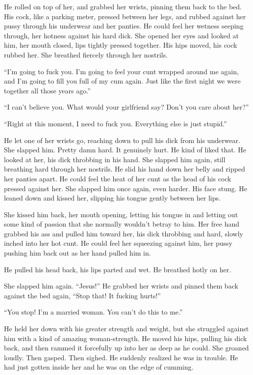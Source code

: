 \documentclass[letterpaper]{article}
\begin{document}
He rolled on top of her, and grabbed her wrists, pinning them back to the bed. His cock, like a parking meter, pressed between her legs, and rubbed against her pussy through his underwear and her panties.
He could feel her wetness seeping through, her hotness against his hard dick.
She opened her eyes and looked at him, her mouth closed, lips tightly pressed together.
His hips moved, his cock rubbed her. She breathed fiercely through her nostrils.

``I'm going to fuck you. I'm going to feel your cunt wrapped around me again, and I'm going to fill you full of my cum again. Just like the first night we were together all those years ago.''

``I can't believe you. What would your girlfriend say? Don't you care about her?''

``Right at this moment, I need to fuck you. Everything else is just stupid.''

He let one of her wrists go, reaching down to pull his dick from his underwear.
She slapped him. Pretty damn hard. It genuinely hurt. He kind of liked that. He looked at her, his dick throbbing in his hand.
She slapped him again, still breathing hard through her nostrils. He slid his hand down her belly and ripped her panties apart. He could feel the heat of her cunt as the head of his cock pressed against her.
She slapped him once again, even harder. His face stung. He leaned down and kissed her, slipping his tongue gently between her lips.

She kissed him back, her mouth opening, letting his tongue in and letting out some kind of passion that she normally wouldn't betray to him.
Her free hand grabbed his ass and pulled him toward her, his dick throbbing and hard, slowly inched into her hot cunt. He could feel her squeezing against him, her pussy pushing him back out as her hand pulled him in.

He pulled his head back, his lips parted and wet. He breathed hotly on her.

She slapped him again. ``Jesus!'' He grabbed her wrists and pinned them back against the bed again, ``Stop that! It fucking hurts!''

``You stop! I'm a married woman. You can't do this to me.''

He held her down with his greater strength and weight, but she struggled against him with a kind of amazing woman-strength.
He moved his hips, pulling his dick back, and then rammed it forcefully up into her as deep as he could.
She groaned loudly. Then gasped. Then sighed. He suddenly realized he was in trouble. He had just gotten inside her and he was on the edge of cumming.
\end{document}
